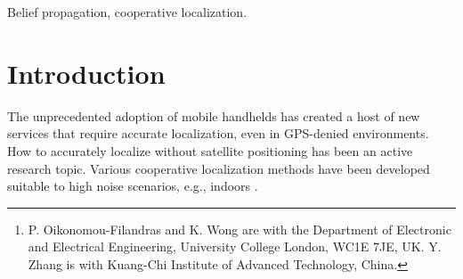 \documentclass[10pt, final, journal]{IEEEtran}
\title{\mytitle}
\author{
{\myauthor, \supervisor, and Yangyang Zhang}\thanks{P. Oikonomou-Filandras and K. Wong are with the Department of Electronic and Electrical Engineering, University College London, WC1E 7JE, UK. Y. Zhang is with Kuang-Chi Institute of Advanced Technology, China.}
\vspace{1.6mm}\\
\fontsize{10}{10}\selectfont\itshape

\fontsize{9}{9}\selectfont\ttfamily\upshape
}
\begin{document}
\maketitle
\thispagestyle{empty}
\pagestyle{empty}


\def\bibliocommand{}

\begin{abstract}
We present a novel parametric message representation for belief propagation (BP) that provides a novel grid-based way to address the cooperative localization problem in wireless networks. The proposed Grid-BP approach allows faster calculations than non-parametric  representations and works well with existing grid-based coordinate systems, e.g., NATO's military grid reference system (MGRS). This overcomes the hidden challenge inherent in all distributed localization algorithms that require a universally known global reference system (GCS), even though every node localizes using  arbitrary local coordinate systems (LCSs) for a reference. Simulation results demonstrate that Grid-BP achieves similar accuracy at much reduced complexity when compared to common techniques that assume {\em ideal} reference.
\end{abstract}

\begin{keywords}
Belief propagation, cooperative localization.
\end{keywords}

\vspace{-.1in}
\section{Introduction}\label{introduction}
The unprecedented adoption of mobile handhelds has created a host of new services that require accurate localization, even in GPS-denied environments. How to accurately localize without satellite positioning has been an active research topic. Various cooperative localization methods have been developed suitable to high noise scenarios, e.g., indoors \cite{Patwari:2005kc,Wymeersch:2009hv}.
\end{document}
